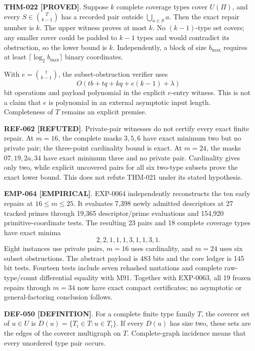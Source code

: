 \documentclass[11pt]{article}
\newcommand{\claimstatus}[2]{\textbf{#1 [#2]}}
\begin{document}
\claimstatus{THM-022}{PROVED}. Suppose \(k\) complete coverage types cover
\(U(\Pi)\), and every \(S\in\binom{T}{k-1}\) has a recorded pair outside
\(\bigcup_{a\in S}a\). Then the exact repair number is \(k\). The upper
witness proves at most \(k\). No \((k-1)\)-type set covers; any smaller cover
could be padded to \(k-1\) types and would contradict its obstruction, so
the lower bound is \(k\). Independently, a block of size \(b_{\max}\)
requires at least \(\lceil\log_2b_{\max}\rceil\) binary coordinates.

With \(e=\binom{t}{k-1}\), the subset-obstruction verifier uses
\[
 O(tb+tq+kq+e(k-1)+\lambda)
\]
bit operations and payload polynomial in the explicit \(e\)-entry witness.
This is not a claim that \(e\) is polynomial in an external asymptotic input
length. Completeness of \(T\) remains an explicit premise.

\claimstatus{REF-062}{REFUTED}. Private-pair witnesses do not certify every
exact finite repair. At \(m=16\), the complete masks \(3,5,6\) have exact
minimum two but no private pair; the three-point cardinality bound is exact.
At \(m=24\), the masks \(07,19,2a,34\) have exact minimum three and no
private pair. Cardinality gives only two, while explicit uncovered pairs for
all six two-type subsets prove the exact lower bound. This does not refute
THM-021 under its stated hypothesis.

\claimstatus{EMP-064}{EMPIRICAL}. EXP-0064 independently reconstructs the
ten early repairs at \(16\le m\le25\). It evaluates 7,398 newly admitted
descriptors at 27 tracked primes through 19,365 descriptor/prime evaluations
and 154,920 primitive-coordinate tests. The resulting 23 pairs and 18
complete coverage types have exact minima
\[
 2,2,1,1,1,3,1,1,3,1.
\]
Eight instances use private pairs, \(m=16\) uses cardinality, and \(m=24\)
uses six subset obstructions. The abstract payload is 483 bits and the core
ledger is 145 bit tests. Fourteen tests include seven rehashed mutations and
complete raw-type/count differential equality with M91. Together with
EXP-0063, all 19 frozen repairs through \(m=34\) now have exact compact
certificates; no asymptotic or general-factoring conclusion follows.

\claimstatus{DEF-050}{DEFINITION}. For a complete finite type family \(T\),
the coverer set of \(u\in U\) is
\(D(u)=\{T_i\in T:u\in T_i\}\). If every \(D(u)\) has size two, these sets
are the edges of the coverer multigraph on \(T\). Complete-graph incidence
means that every unordered type pair occurs.
\end{document}

